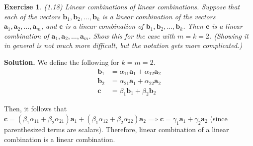 \documentclass[11pt]{book}
\theoremstyle{definition}
\theoremstyle{plain}
\newtheorem{exercise}{Exercise}[chapter]
\theoremstyle{problemstyle}
\theoremstyle{remark}
\theoremstyle{definition}
\begin{document}
\begin{exercise}
    (1.18) Linear combinations of linear combinations. Suppose that each of the vectors $\boldsymbol{b}_1,\boldsymbol{b}_2,\dots,\boldsymbol{b}_k$ is a linear combination of the vectors $\boldsymbol{a}_1,\boldsymbol{a}_2,\dots,\boldsymbol{a}_m$, and $\boldsymbol{c}$ is a linear combination of $\boldsymbol{b}_1,\boldsymbol{b}_2,\dots,\boldsymbol{b}_k$.  Then $\boldsymbol{c}$ is a linear combination of $\boldsymbol{a}_1,\boldsymbol{a}_2,\dots,\boldsymbol{a}_m$. Show this for the case with $m=k=2$.  (Showing it in general is not much more difficult, but the notation gets more complicated.)

\end{exercise}
\textbf{Solution.}
We define the following for $k=m=2$.
\begin{equation}
    \label{eq:abc-definitions}
    \begin{aligned}
        \boldsymbol{b}_1&=\alpha_{11}\boldsymbol{a}_1+\alpha_{12}\boldsymbol{a}_2\\
        \boldsymbol{b}_2&=\alpha_{21}\boldsymbol{a}_1+\alpha_{22}\boldsymbol{a}_2\\
        \boldsymbol{c}&=\beta_1\boldsymbol{b}_1+\beta_2\boldsymbol{b}_2
    \end{aligned}
\end{equation}

Then, it follows that $\boldsymbol{c}=(\beta_1\alpha_{11}+\beta_2\alpha_{21})\boldsymbol{a}_1+(\beta_1\alpha_{12}+\beta_2\alpha_{22})\boldsymbol{a}_2\implies\boldsymbol{c}=\gamma_1\boldsymbol{a}_1+\gamma_2\boldsymbol{a}_2$ (since parenthesized terms are scalars). Therefore, linear combination of a linear combination is a linear combination.
\end{document}
